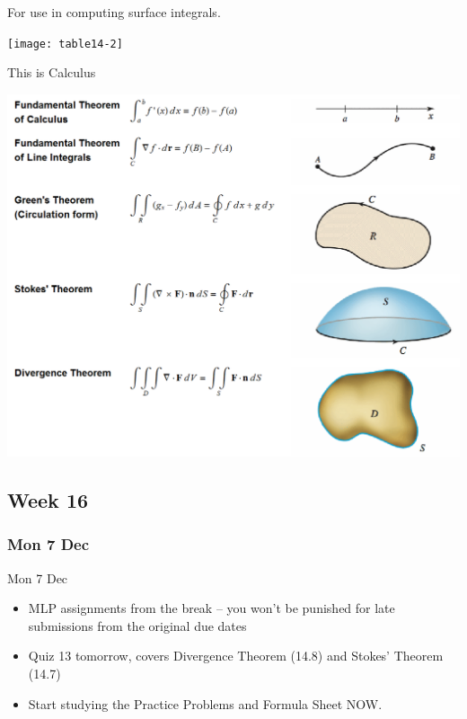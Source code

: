\documentclass[12pt]{beamer}
\theoremstyle{plain}
\theoremstyle{definition}
\begin{document}
% 
\begin{frame}
\begin{center}
For use in computing surface integrals.
\vspace{0.5pc}

\texttt{[image: table14-2]}
\end{center}
\end{frame}

% 
\begin{frame}
\begin{center}
This is Calculus
\vspace{0.5pc}

\includegraphics[scale=.5]{fundamentalTheorems}
\end{center}
\end{frame}

\subsection{Week 16}
\subsubsection{Mon 7 Dec}
\begin{frame}{Mon 7 Dec}%
\begin{itemize}
\item MLP assignments from the break -- you won't be punished for late submissions from the original due dates 
\item Quiz 13 tomorrow, covers Divergence Theorem (14.8) and Stokes' Theorem (14.7)
\item Start studying the Practice Problems and Formula Sheet NOW.
\end{itemize}
\end{frame}
\end{document}
